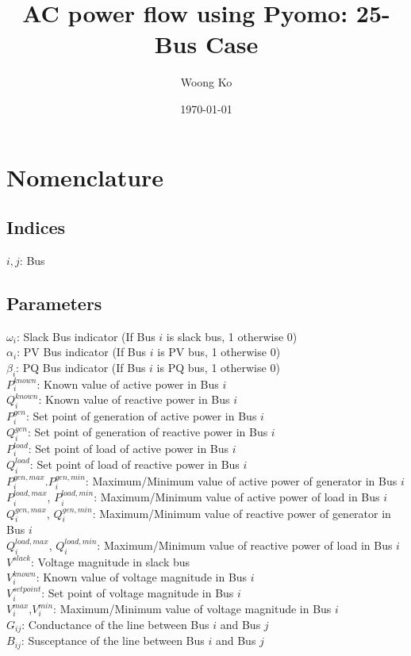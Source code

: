 \documentclass{article}
\title{AC power flow using Pyomo: 25-Bus Case}
\author{Woong Ko}
\date{\today}
\begin{document}
\maketitle

\begin{abstract}

\end{abstract}

\newpage
\section{Nomenclature}
\subsection{Indices}
\noindent
$i, j$: Bus

\subsection{Parameters}
\noindent
$\omega_{i}$: Slack Bus indicator (If Bus $i$ is slack bus, 1 otherwise 0)\\
$\alpha_{i}$: PV Bus indicator (If Bus $i$ is PV bus, 1 otherwise 0)\\
$\beta_{i}$: PQ Bus indicator (If Bus $i$ is PQ bus, 1 otherwise 0)\\
\noindent
$P^{known}_{i}$: Known value of active power in Bus $i$\\
$Q^{known}_{i}$: Known value of reactive power in Bus $i$\\
$P^{gen}_{i}$: Set point of generation of active power in Bus $i$\\
$Q^{gen}_{i}$: Set point of generation of reactive power in Bus $i$\\
$P^{load}_{i}$: Set point of load of active power in Bus $i$\\
$Q^{load}_{i}$: Set point of load of reactive power in Bus $i$\\
$P^{gen,max}_{i}$.$P^{gen,min}_{i}$: Maximum/Minimum value of active power of generator in Bus $i$\\
$P^{load,max}_{i}$, $P^{load,min}_{i}$: Maximum/Minimum value of active power of load in Bus $i$\\
$Q^{gen,max}_{i}$, $Q^{gen,min}_{i}$: Maximum/Minimum value of reactive power of generator in Bus $i$\\
$Q^{load,max}_{i}$, $Q^{load,min}_{i}$: Maximum/Minimum value of reactive power of load in Bus $i$\\
\noindent
$V^{slack}$: Voltage magnitude in slack bus\\
$V^{known}_{i}$: Known value of voltage magnitude in Bus $i$\\
$V^{setpoint}_{i}$: Set point of voltage magnitude in Bus $i$\\
$V^{max}_{i}$,$V^{min}_{i}$: Maximum/Minimum value of voltage magnitude in Bus $i$\\
$G_{ij}$: Conductance of the line between Bus $i$ and Bus $j$\\
$B_{ij}$: Susceptance of the line between Bus $i$ and Bus $j$\\
\end{document}
